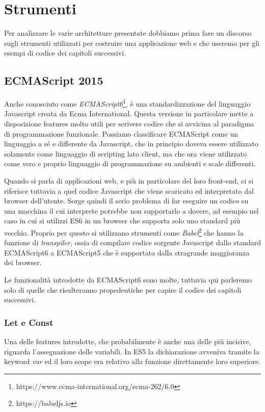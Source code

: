 \chapter{Strumenti}
Per analizzare le varie architetture presentate dobbiamo prima fare un discorso sugli strumenti utilizzati per costruire una applicazione web e che useremo per gli esempi di codice dei capitoli successivi.

\section{ECMAScript 2015}
Anche conosciuto come \textit{ECMAScript6}\footnote{https://www.ecma-international.org/ecma-262/6.0}, è una standardizzazione del linguaggio Javascript creata da Ecma International. Questa versione in particolare mette a disposizione features molto utili per scrivere codice che si avvicina al paradigma di programmazione funzionale. Possiamo classificare ECMAScript come un linguaggio a sé e differente da Javascript, che in principio doveva essere utilizzato solamente come linguaggio di scripting lato client, ma che ora viene utilizzato come vero e proprio linguaggio di programmazione su ambienti e scale differenti.
 
Quando si parla di applicazioni web, e più in particolare del loro front-end, ci si riferisce tuttavia a quel codice Javascript che viene scaricato ed interpretato dal browser dell'utente. Sorge quindi il serio problema di far eseguire un codice su una macchina il cui interprete potrebbe non supportarlo a dovere, ad esempio nel caso in cui si utilizzi ES6 in un browser che supporta solo uno standard più vecchio. Proprio per questo si utilizzano strumenti come \textit{Babel}\footnote{https://babeljs.io} che hanno la funzione di \textit{transpiler}, ossia di compilare codice sorgente Javascript dallo standard ECMAScript6 a ECMAScript5 che è supportato dalla stragrande maggioranza dei browser.

Le funzionalità introdotte da ECMAScript6 sono molte, tuttavia qui parleremo solo di quelle che risulteranno propedeutiche per capire il codice dei capitoli successivi.

\subsection{Let e Const}
Una delle features introdotte, che probabilmente è anche una delle più incisive, riguarda l'assegnazione delle variabili. In ES5 la dichiarazione avveniva tramite la keyword \textit{var} ed il loro scope era relativo alla funzione direttamente loro superiore.
 

